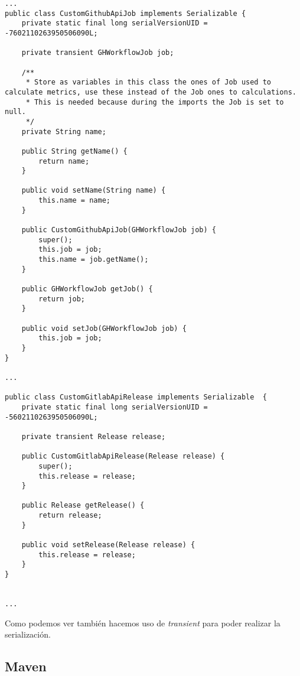 \begin{minipage}{\linewidth}
{\tiny
\begin{verbatim}
...
public class CustomGithubApiJob implements Serializable {
	private static final long serialVersionUID = -7602110263950506090L;
	
	private transient GHWorkflowJob job;
	
	/**
	 * Store as variables in this class the ones of Job used to calculate metrics, use these instead of the Job ones to calculations.
	 * This is needed because during the imports the Job is set to null.
	 */
	private String name;
	
	public String getName() {
		return name;
	}

	public void setName(String name) {
		this.name = name;
	}

	public CustomGithubApiJob(GHWorkflowJob job) {
		super();
		this.job = job;
		this.name = job.getName();
	}

	public GHWorkflowJob getJob() {
		return job;
	}

	public void setJob(GHWorkflowJob job) {
		this.job = job;
	}
}

...

public class CustomGitlabApiRelease implements Serializable  {
	private static final long serialVersionUID = -5602110263950506090L;

	private transient Release release;

	public CustomGitlabApiRelease(Release release) {
		super();
		this.release = release;
	}

	public Release getRelease() {
		return release;
	}

	public void setRelease(Release release) {
		this.release = release;
	}
}


...
\end{verbatim}
}
\end{minipage}

Como podemos ver también hacemos uso de \textit{transient} para poder realizar la serialización.

\subsection{Maven}

